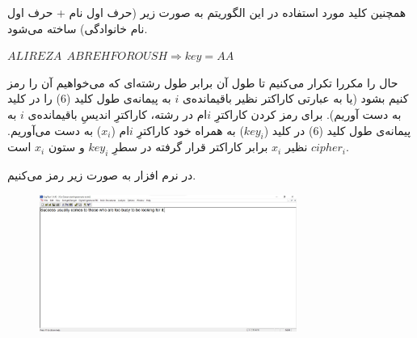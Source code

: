 \documentclass{article}
\begin{document}
همچنین کلید مورد استفاده در این الگوریتم به صورت زیر (حرف اول نام + حرف اول نام خانوادگی) ساخته می‌شود.
\begin{latin}
$
ALIREZA\:\:ABREHFOROUSH \Rightarrow key = AA
$
\end{latin}
حال  را مکررا تکرار می‌کنیم تا طول آن برابر طول رشته‌ای که می‌خواهیم آن را رمز کنیم بشود (یا به عبارتی کاراکتر نظیر باقیمانده‌ی $i$ به پیمانه‌ی طول کلید (6) را در کلید به دست آوریم). برای رمز کردن کاراکترِ $i$ام در رشته، کاراکترِ اندیسِ باقیمانده‌ی $i$ به پیمانه‌ی طول کلید (6) در کلید ($key_i$) به همراه خود کاراکترِ $i$ام ($x_i$) به دست می‌آوریم. $cipher_i$ نظیر $x_i$ برابر کاراکتر قرار گرفته در سطرِ $key_i$ و ستون $x_i$ است.
\begin{latin}
\begin{table}[H]
\end{table}
\end{latin}
در نرم افزار  به صورت زیر رمز می‌کنیم.
\begin{figure}[H]
    \centering
    \includegraphics[width=0.75\textwidth]{figures/3aa.jpg}
    \caption
	{}
    \label{fig:fig1}
\end{figure}
\end{document}
